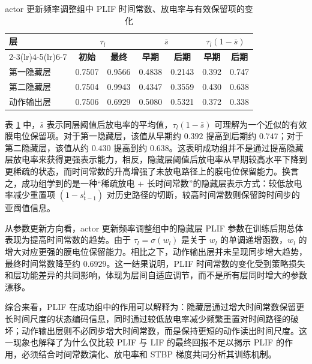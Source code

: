 \documentclass[UTF8,zihao=-4,oneside,openany]{ctexbook}
\begin{document}
\begin{table}[htbp]
\centering
\caption{actor 更新频率调整组中 PLIF 时间常数、放电率与有效保留项的变化}
\label{tab:policy-freq-tau}
\setlength{\tabcolsep}{4pt}
\begin{tabular}{lcccccc}
\toprule
\textbf{层} & \multicolumn{2}{c}{\textbf{$\tau_l$}} & \multicolumn{2}{c}{\textbf{$\bar{s}$}} & \multicolumn{2}{c}{\textbf{$\tau_l(1-\bar{s})$}} \\
\cmidrule(lr){2-3}\cmidrule(lr){4-5}\cmidrule(lr){6-7}
 & \textbf{初始} & \textbf{最终} & \textbf{早期} & \textbf{后期} & \textbf{早期} & \textbf{后期} \\
\midrule
第一隐藏层 & 0.7507 & 0.9566 & 0.4838 & 0.2143 & 0.392 & 0.747 \\
第二隐藏层 & 0.7504 & 0.9943 & 0.4347 & 0.3559 & 0.430 & 0.638 \\
动作输出层 & 0.7506 & 0.6929 & 0.5080 & 0.5321 & 0.372 & 0.338 \\
\bottomrule
\end{tabular}
\end{table}

表 \ref{tab:policy-freq-tau} 中，$\bar{s}$ 表示同层阈值后放电率的平均值，$\tau_l(1-\bar{s})$ 可理解为一个近似的有效膜电位保留项。对于第一隐藏层，该值从早期约 $0.392$ 提高到后期约 $0.747$；对于第二隐藏层，该值从约 $0.430$ 提高到约 $0.638$。这表明成功组并不是通过提高隐藏层放电率来获得更强表示能力，相反，隐藏层阈值后放电率从早期较高水平下降到更稀疏的状态，而时间常数的升高增强了未放电路径上的膜电位保留能力。换言之，成功组学到的是一种“稀疏放电 + 长时间常数”的隐藏层表示方式：较低放电率减少重置项 $(1-s_{t-1}^l)$ 对历史路径的切断，较高时间常数则保留跨时间步的亚阈值信息。

从参数更新方向看，actor 更新频率调整组中的隐藏层 PLIF 参数在训练后期总体表现为提高时间常数的趋势。由于 $\tau_l=\sigma(w_l)$ 是关于 $w_l$ 的单调递增函数，$w_l$ 的增大对应更强的膜电位保留能力。相比之下，动作输出层并未呈现同步增大趋势，最终时间常数降至约 $0.6929$。这一结果说明，PLIF 时间常数的变化受到策略损失和层功能差异的共同影响，体现为层间自适应调节，而不是所有层同时增大的参数漂移。

综合来看，PLIF 在成功组中的作用可以解释为：隐藏层通过增大时间常数保留更长时间尺度的状态编码信息，同时通过较低放电率减少频繁重置对时间路径的破坏；动作输出层则不必同步增大时间常数，而是保持更短的动作读出时间尺度。这一现象也解释了为什么仅比较 PLIF 与 LIF 的最终回报不足以揭示 PLIF 的作用，必须结合时间常数演化、放电率和 STBP 梯度共同分析其训练机制。

\FloatBarrier
\end{document}
